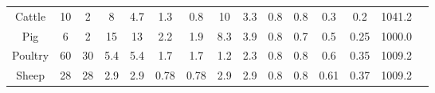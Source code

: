 \begin{refsection}[referencesCh2]
\begin{table}[]
{\begin{tabular}{@{}ccccccccccccccc@{}}
		Cattle                                                                     & 10                                      & 2                                      & 8                                     & 4.7                                   & 1.3                                   & 0.8                                   & 10                                    & 3.3                                   & 0.8                                    & 0.8                                   & 0.3                                      & 0.2                                     & 1041.2                                   &                                   \\
		Pig                                                                        & 6                                       & 2                                      & 15                                    & 13                                    & 2.2                                   & 1.9                                   & 8.3                                   & 3.9                                   & 0.8                                    & 0.7                                   & 0.5                                      & 0.25                                    & 1000.0                                   &                                   \\
		Poultry                                                                    & 60                                      & 30                                     & 5.4                                   & 5.4                                   & 1.7                                   & 1.7                                   & 1.2                                   & 2.3                                   & 0.8                                    & 0.8                                   & 0.6                                      & 0.35                                    & 1009.2                                   &                                   \\
		Sheep                                                                      & 28                                      & 28                                     & 2.9                                   & 2.9                                   & 0.78                                  & 0.78                                  & 2.9                                   & 2.9                                   & 0.8                                    & 0.8                                   & 0.61                                     & 0.37                                    & 1009.2                                   &                                   \\ \bottomrule
	\end{tabular}
	}
\end{table}


\end{refsection}
